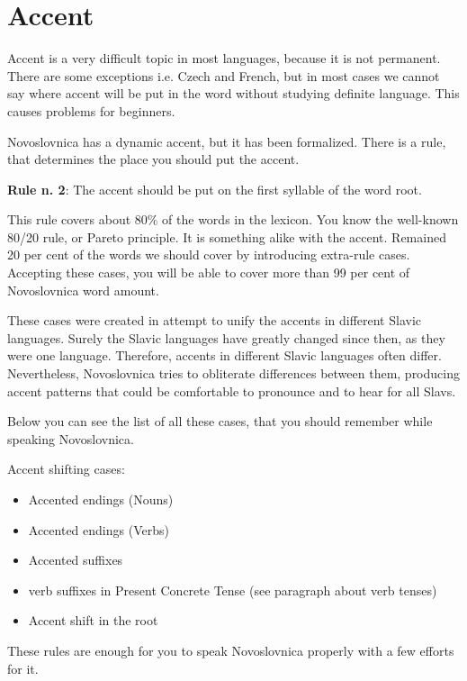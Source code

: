 \section{Accent}

Accent is a very difficult topic in most languages, because it is not permanent. There are some exceptions i.e. Czech and French, but in most cases we cannot say where accent will be put in the word without studying definite language. This causes problems for beginners.

Novoslovnica has a dynamic accent, but it has been formalized. There is a rule, that determines the place you should put the accent. 

\textbf{Rule n. 2}: The accent should be put on the first syllable of the word root.

This rule covers about 80\% of the words in the lexicon. You know the well-known 80/20 rule, or Pareto principle. It is something alike with the accent. Remained 20 per cent of the words we should cover by introducing extra-rule cases. Accepting these cases, you will be able to cover more than 99 per cent of Novoslovnica word amount.

These cases were created in attempt to unify the accents in different Slavic languages. Surely the Slavic languages have greatly changed since then, as they were one language. Therefore, accents in different Slavic languages often differ. Nevertheless, Novoslovnica tries to obliterate differences between them, producing accent patterns that could be comfortable to pronounce and to hear for all Slavs.

Below you can see the list of all these cases, that you should remember while speaking Novoslovnica.

Accent shifting cases:

\begin{itemize}
	\item{Accented endings (Nouns)}
	\item{Accented endings (Verbs)}
	\item{Accented suffixes}
	\item{verb suffixes in Present Concrete Tense (see paragraph about verb tenses)}
	\item{Accent shift in the root}
\end{itemize}

These rules are enough for you to speak Novoslovnica properly with a few efforts for it. 
